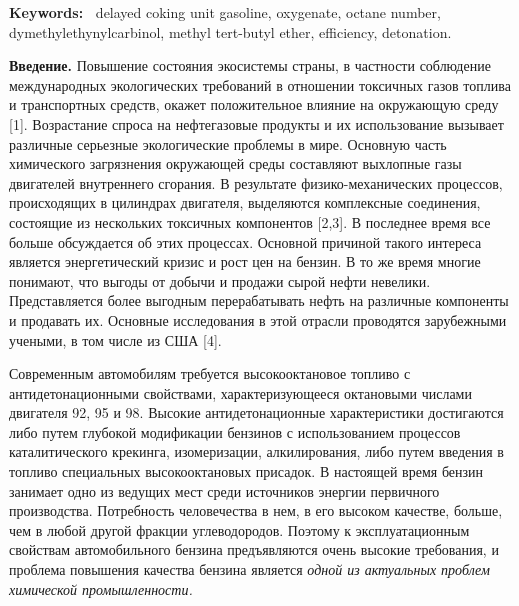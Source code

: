 {\bfseries Keywords:~} delayed coking unit gasoline, oxygenate, octane
number, dymethylethynylcarbinol, methyl tert-butyl ether, efficiency,
detonation.

{\bfseries Введение.} Повышение состояния экосистемы страны, в частности
соблюдение международных экологических требований в отношении токсичных
газов топлива и транспортных средств, окажет положительное влияние на
окружающую среду {[}1{]}. Возрастание спроса на нефтегазовые продукты и
их использование вызывает различные серьезные экологические проблемы в
мире. Основную часть химического загрязнения окружающей среды составляют
выхлопные газы двигателей внутреннего сгорания. В результате
физико-механических процессов, происходящих в цилиндрах двигателя,
выделяются комплексные соединения, состоящие из нескольких токсичных
компонентов {[}2,3{]}. В последнее время все больше обсуждается об этих
процессах. Основной причиной такого интереса является энергетический
кризис и рост цен на бензин. В то же время многие понимают, что выгоды
от добычи и продажи сырой нефти невелики. Представляется более выгодным
перерабатывать нефть на различные компоненты и продавать их. Основные
исследования в этой отрасли проводятся зарубежными учеными, в том числе
из США {[}4{]}.

Современным автомобилям требуется высокооктановое топливо с
антидетонационными свойствами, характеризующееся октановыми числами
двигателя 92, 95 и 98. Высокие антидетонационные характеристики
достигаются либо путем глубокой модификации бензинов с использованием
процессов каталитического крекинга, изомеризации, алкилирования, либо
путем введения в топливо специальных высокооктановых присадок. В
настоящей время бензин занимает одно из ведущих мест среди источников
энергии первичного производства. Потребность человечества в нем, в его
высоком качестве, больше, чем в любой другой фракции углеводородов.
Поэтому к эксплуатационным свойствам автомобильного бензина
предъявляются очень высокие требования, и проблема повышения качества
бензина является \emph{одной из актуальных проблем химической
промышленности.}

